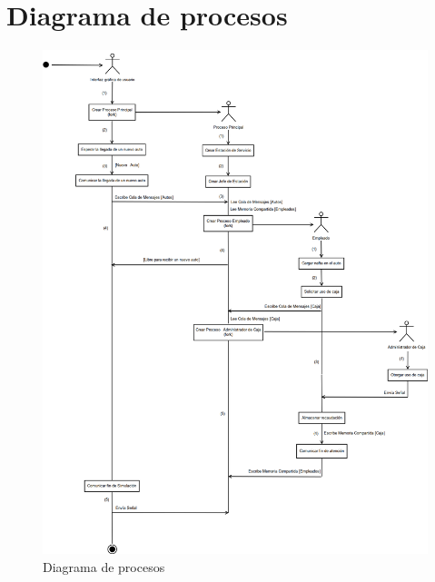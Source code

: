 \documentclass[12pt,a4paper,titlepage,oneside]{article}
\begin{document}
\section{Diagrama de procesos}
\begin{figure}[hbtp]
\begin{center}
\includegraphics[scale=0.3]{diagramaDeProcesos.png} 
\end{center}
\caption{Diagrama de procesos}
\end{figure}
\end{document}
